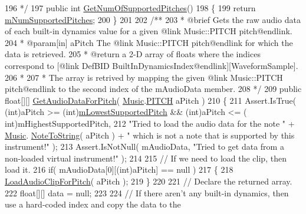 \begin{DoxyCodeInclude}
196 \textcolor{comment}{     */}
197     \textcolor{keyword}{public} \textcolor{keywordtype}{int} \hyperlink{group___v_i_base_pub_func_ga6ce5a7b3406269ea433be721d7d11177}{GetNumOfSupportedPitches}()
198     \{
199         \textcolor{keywordflow}{return} \hyperlink{group___v_i_base_pro_var_gafc759a16324cf9b3f230bcbf040afcd2}{mNumSupportedPitches};
200     \}
201 \textcolor{comment}{}
202 \textcolor{comment}{    /** }
203 \textcolor{comment}{     * @brief Gets the raw audio data of each built-in dynamics value for a given @link Music::PITCH
       pitch@endlink. }
204 \textcolor{comment}{     * @param[in] aPitch The @link Music::PITCH pitch@endlink for which the data is retrieved.}
205 \textcolor{comment}{     * @return a 2-D array of floats where the indices correspond to [@link DefBID
       BuiltInDynamicsIndex@endlink][WaveformSample]. }
206 \textcolor{comment}{     * }
207 \textcolor{comment}{     * The array is retrived by mapping the given @link Music::PITCH pitch@endlink to the second index of
       the mAudioData member.}
208 \textcolor{comment}{     */}
209     \textcolor{keyword}{public} \textcolor{keywordtype}{float}[][] \hyperlink{group___v_i_base_pub_func_gaf715f7c3bbd2f1a2fa543b2f0684f8a6}{GetAudioDataForPitch}( \hyperlink{class_music}{Music}.\hyperlink{group___music_enums_ga508f69b199ea518f935486c990edac1d}{PITCH} aPitch )
210     \{
211         Assert.IsTrue( (\textcolor{keywordtype}{int})aPitch >= (\textcolor{keywordtype}{int})\hyperlink{group___v_i_base_pro_var_ga3cae52b1bcc0178a8a6b03c7aaf7aac8}{mLowestSupportedPitch} && (\textcolor{keywordtype}{int})aPitch <= (\textcolor{keywordtype}{
      int})mHighestSupportedPitch,
212             \textcolor{stringliteral}{"Tried to load the audio data for the note "} + \hyperlink{class_music}{Music}.
      \hyperlink{group___music_stat_func_ga85a22c905d56d4c5f4e62159bfecee8c}{NoteToString}( aPitch ) + \textcolor{stringliteral}{" which is not a note that is supported by this instrument!"} );
213         Assert.IsNotNull( mAudioData, \textcolor{stringliteral}{"Tried to get data from a non-loaded virtual instrument!"} );
214 
215         \textcolor{comment}{// If we need to load the clip, then load it.}
216         \textcolor{keywordflow}{if}( mAudioData[0][(\textcolor{keywordtype}{int})aPitch] == null )
217         \{
218             \hyperlink{group___v_i_base_pro_func_gadbd95083895b09465fbc5b18115a1dbc}{LoadAudioClipForPitch}( aPitch );
219         \}
220 
221         \textcolor{comment}{// Declare the returned array.}
222         \textcolor{keywordtype}{float}[][] data = null;
223 
224         \textcolor{comment}{// If there aren't any built-in dynamics, then use a hard-coded index and copy the data to the
}
\end{DoxyCodeInclude}
